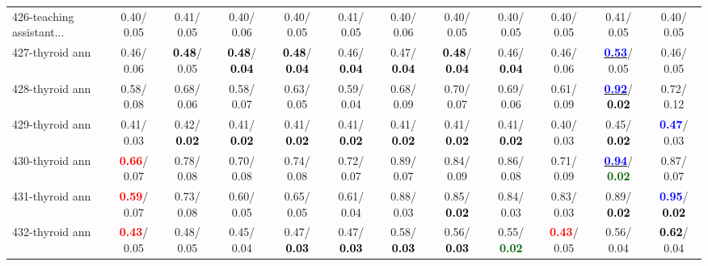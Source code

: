 \begin{table}[h]
\begin{center}
{\begin{tabular}{lc|c|c|c|c|c|c|c|c|c|c}
426-teaching assistant... &   0.40/  0.05 &   0.41/  0.05 &   0.40/  0.06 &   0.40/  0.05 &   0.41/  0.05 &   0.40/  0.06 &   0.40/  0.05 &   0.40/  0.05 &   0.40/  0.05 &   0.41/  0.05 &   0.40/  0.05 \\
427-thyroid ann &   0.46/  0.06 & \textcolor{black}{\textbf{  0.48}}/  0.05 & \textcolor{black}{\textbf{  0.48}}/\textcolor{black}{\textbf{  0.04}} & \textcolor{black}{\textbf{  0.48}}/\textcolor{black}{\textbf{  0.04}} &   0.46/\textcolor{black}{\textbf{  0.04}} &   0.47/\textcolor{black}{\textbf{  0.04}} & \textcolor{black}{\textbf{  0.48}}/\textcolor{black}{\textbf{  0.04}} &   0.46/\textcolor{black}{\textbf{  0.04}} &   0.46/  0.06 & \underline{\textcolor{blue}{\textbf{  0.53}}}/  0.05 &   0.46/  0.05 \\
428-thyroid ann &   0.58/  0.08 &   0.68/  0.06 &   0.58/  0.07 &   0.63/  0.05 &   0.59/  0.04 &   0.68/  0.09 &   0.70/  0.07 &   0.69/  0.06 &   0.61/  0.09 & \underline{\textcolor{blue}{\textbf{  0.92}}}/\textcolor{black}{\textbf{  0.02}} &   0.72/  0.12 \\
429-thyroid ann &   0.41/  0.03 &   0.42/\textcolor{black}{\textbf{  0.02}} &   0.41/\textcolor{black}{\textbf{  0.02}} &   0.41/\textcolor{black}{\textbf{  0.02}} &   0.41/\textcolor{black}{\textbf{  0.02}} &   0.41/\textcolor{black}{\textbf{  0.02}} &   0.41/\textcolor{black}{\textbf{  0.02}} &   0.41/\textcolor{black}{\textbf{  0.02}} &   0.40/  0.03 &   0.45/\textcolor{black}{\textbf{  0.02}} & \textcolor{blue}{\textbf{  0.47}}/  0.03 \\
430-thyroid ann & \textcolor{red}{\textbf{  0.66}}/  0.07 &   0.78/  0.08 &   0.70/  0.08 &   0.74/  0.08 &   0.72/  0.07 &   0.89/  0.07 &   0.84/  0.09 &   0.86/  0.08 &   0.71/  0.09 & \underline{\textcolor{blue}{\textbf{  0.94}}}/\textcolor{darkgreen}{\textbf{  0.02}} &   0.87/  0.07 \\ \hline
431-thyroid ann & \textcolor{red}{\textbf{  0.59}}/  0.07 &   0.73/  0.08 &   0.60/  0.05 &   0.65/  0.05 &   0.61/  0.04 &   0.88/  0.03 &   0.85/\textcolor{black}{\textbf{  0.02}} &   0.84/  0.03 &   0.83/  0.03 &   0.89/\textcolor{black}{\textbf{  0.02}} & \textcolor{blue}{\textbf{  0.95}}/\textcolor{black}{\textbf{  0.02}} \\
432-thyroid ann & \textcolor{red}{\textbf{  0.43}}/  0.05 &   0.48/  0.05 &   0.45/  0.04 &   0.47/\textcolor{black}{\textbf{  0.03}} &   0.47/\textcolor{black}{\textbf{  0.03}} &   0.58/\textcolor{black}{\textbf{  0.03}} &   0.56/\textcolor{black}{\textbf{  0.03}} &   0.55/\textcolor{darkgreen}{\textbf{  0.02}} & \textcolor{red}{\textbf{  0.43}}/  0.05 &   0.56/  0.04 & \textcolor{black}{\textbf{  0.62}}/  0.04 \\

\end{tabular}}
\end{center}
\end{table}
